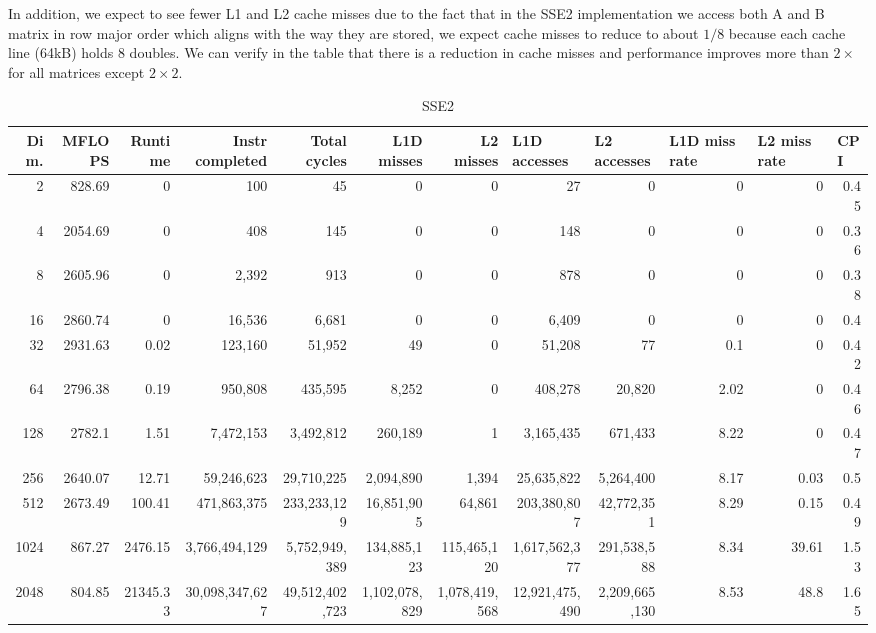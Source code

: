 \documentclass{article}
\begin{document}
In addition, we expect to see fewer L1 and L2 cache misses due to the fact that in the SSE2 implementation we access both A and B matrix in row major order which aligns with the way they are stored, we expect cache misses to reduce to about $1/8$ because each cache line (64kB) holds 8 doubles.  We can verify in the table that there is a reduction in cache misses and performance improves more than $2\times$ for all matrices except $2\times2$.
\begin{table}[htbp]
\tiny
\caption{SSE2}
\begin{tabular}{|r|r|r|r|r|r|r|r|r|r|r|r|}
\hline
Dim. &   MFLOPS &     Runtime & Instr completed & Total cycles & L1D misses & L2 misses & \multicolumn{1}{l|}{L1D accesses} & \multicolumn{1}{l|}{ L2 accesses} & \multicolumn{1}{l|}{L1D miss rate} & \multicolumn{1}{l|}{L2 miss rate} & \multicolumn{1}{l|}{CPI} \\ \hline
2 & 828.69 & 0 & 100 & 45 & 0 & 0 & 27 & 0 & 0 & 0 & 0.45 \\ \hline
4 & 2054.69 & 0 & 408 & 145 & 0 & 0 & 148 & 0 & 0 & 0 & 0.36 \\ \hline
8 & 2605.96 & 0 & 2,392 & 913 & 0 & 0 & 878 & 0 & 0 & 0 & 0.38 \\ \hline
16 & 2860.74 & 0 & 16,536 & 6,681 & 0 & 0 & 6,409 & 0 & 0 & 0 & 0.4 \\ \hline
32 & 2931.63 & 0.02 & 123,160 & 51,952 & 49 & 0 & 51,208 & 77 & 0.1 & 0 & 0.42 \\ \hline
64 & 2796.38 & 0.19 & 950,808 & 435,595 & 8,252 & 0 & 408,278 & 20,820 & 2.02 & 0 & 0.46 \\ \hline
128 & 2782.1 & 1.51 & 7,472,153 & 3,492,812 & 260,189 & 1 & 3,165,435 & 671,433 & 8.22 & 0 & 0.47 \\ \hline
256 & 2640.07 & 12.71 & 59,246,623 & 29,710,225 & 2,094,890 & 1,394 & 25,635,822 & 5,264,400 & 8.17 & 0.03 & 0.5 \\ \hline
512 & 2673.49 & 100.41 & 471,863,375 & 233,233,129 & 16,851,905 & 64,861 & 203,380,807 & 42,772,351 & 8.29 & 0.15 & 0.49 \\ \hline
1024 & 867.27 & 2476.15 & 3,766,494,129 & 5,752,949,389 & 134,885,123 & 115,465,120 & 1,617,562,377 & 291,538,588 & 8.34 & 39.61 & 1.53 \\ \hline
2048 & 804.85 & 21345.33 & 30,098,347,627 & 49,512,402,723 & 1,102,078,829 & 1,078,419,568 & 12,921,475,490 & 2,209,665,130 & 8.53 & 48.8 & 1.65 \\ \hline
\end{tabular}
\label{}
\end{table}
\end{document}
